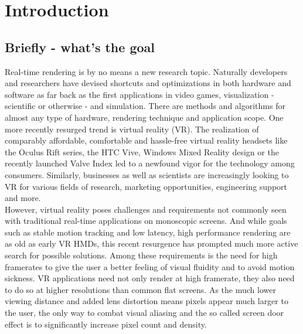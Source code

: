 
\chapter{Introduction}
\section{Briefly - what's the goal}
Real-time rendering is by no means a new research topic. Naturally developers and researchers have devised shortcuts and optimizations in both hardware and software as far back as the first applications in video games, visualization - scientific or otherwise - and simulation. There are methods and algorithms for almost any type of hardware, rendering technique and application scope. 
One more recently resurged trend is virtual reality (VR). The realization of comparably affordable, comfortable and hassle-free virtual reality headsets like the Oculus Rift series, the HTC Vive, Windows Mixed Reality design or the recently launched Valve Index led to a newfound vigor for the technology among consumers. Similarly, businesses as well as scientists are increasingly looking to VR for various fields of research, marketing opportunities, engineering support and more. \\
However, virtual reality poses challenges and requirements not commonly seen with traditional real-time applications on monoscopic screens. And while goals such as stable motion tracking and low latency, high performance rendering are as old as early VR HMDs, this recent resurgence has prompted much more active search for possible solutions. Among these requirements is the need for high framerates to give the user a better feeling of visual fluidity and to avoid motion sickness. VR applications need not only render at high framerate, they also need to do so at higher resolutions than common flat screens. As the much lower viewing distance and added lens distortion means pixels appear much larger to the user, the only way to combat visual aliasing and the so called screen door effect is to significantly increase pixel count and density. \\

